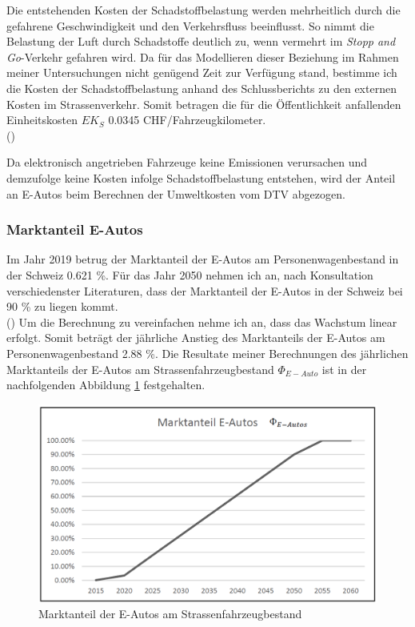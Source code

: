 Die entstehenden Kosten der Schadstoffbelastung werden mehrheitlich durch die gefahrene Geschwindigkeit und den Verkehrsfluss beeinflusst. So nimmt die Belastung der Luft durch Schadstoffe deutlich zu, wenn vermehrt im \textit{Stopp and Go}-Verkehr gefahren wird. Da für das Modellieren dieser Beziehung im Rahmen meiner Untersuchungen nicht genügend Zeit zur Verfügung stand, bestimme ich die Kosten der Schadstoffbelastung  anhand des Schlussberichts zu den externen Kosten im Strassenverkehr. Somit betragen die für die Öffentlichkeit anfallenden Einheitskosten $EK_{S}$ 0.0345 CHF/Fahrzeugkilometer. \\
 (\cite{Ecoplan2007}) 

Da elektronisch angetrieben Fahrzeuge keine Emissionen verursachen und demzufolge keine Kosten infolge Schadstoffbelastung entstehen, wird der Anteil an E-Autos beim Berechnen der Umweltkosten vom DTV abgezogen.  



\newpage

\subsubsection*{Marktanteil E-Autos}
\label{subsubsec:Marktanteil}

Im Jahr 2019 betrug der Marktanteil der E-Autos am Personenwagenbestand in der Schweiz 0.621 \%. Für das Jahr 2050 nehmen ich an, nach Konsultation verschiedenster Literaturen, dass der Marktanteil der E-Autos in der Schweiz bei 90 \% zu liegen kommt. \\ (\cite{Bestand2019}) 
Um die Berechnung zu vereinfachen nehme ich an, dass das Wachstum linear erfolgt. Somit beträgt der jährliche Anstieg des Marktanteils der E-Autos am Personenwagenbestand 2.88 \%. Die Resultate meiner Berechnungen des jährlichen Marktanteils der E-Autos am Strassenfahrzeugbestand \( \Phi_{E-Auto} \) ist in der nachfolgenden Abbildung \ref{img:Marktanteil} festgehalten. 

\begin{figure}[h!]
	\centering
	\includegraphics[width=.6\textwidth]{figures/f-04-04-01-MarktanteilE-Auto}
	\caption[Marktanteil E-Autos]{Marktanteil der E-Autos am Strassenfahrzeugbestand}
	\label{img:Marktanteil}
\end{figure}

